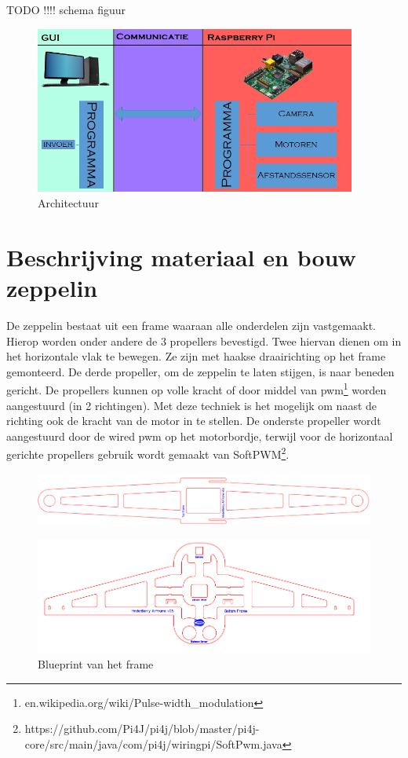 \documentclass[tt]{penoverslag}
\begin{document}
TODO !!!! schema figuur
\begin{figure}[ht!]
\centering
\includegraphics[height=55mm]{Schema.jpg}
\caption{Architectuur}
\label{schema}
\end{figure}

\section{Beschrijving materiaal en bouw zeppelin}
De zeppelin bestaat uit een frame waaraan alle onderdelen zijn vastgemaakt. Hierop worden onder andere de 3 propellers bevestigd. Twee hiervan dienen om in het horizontale vlak te bewegen. Ze zijn met haakse draairichting op het frame gemonteerd. De derde propeller, om de zeppelin te laten stijgen, is naar beneden gericht. De propellers kunnen op volle kracht of door middel van pwm\footnote{en.wikipedia.org/wiki/Pulse-width\_modulation} worden aangestuurd (in 2 richtingen). Met deze techniek is het mogelijk om naast de richting ook de kracht van de motor in te stellen. De onderste propeller wordt aangestuurd door de wired pwm op het motorbordje, terwijl voor de horizontaal gerichte propellers gebruik wordt gemaakt van SoftPWM\footnote{https://github.com/Pi4J/pi4j/blob/master/pi4j-core/src/main/java/com/pi4j/wiringpi/SoftPwm.java}. ~\\

\begin{figure}[h!]
\centering
\includegraphics[scale=0.3]{upperFrame.png}
\label{frame}
\end{figure}

\begin{figure}[h!]
\centering
\includegraphics[scale=0.3]{lowerFrame.png}
\caption{Blueprint van het frame}
\label{frame}
\end{figure}
\end{document}

